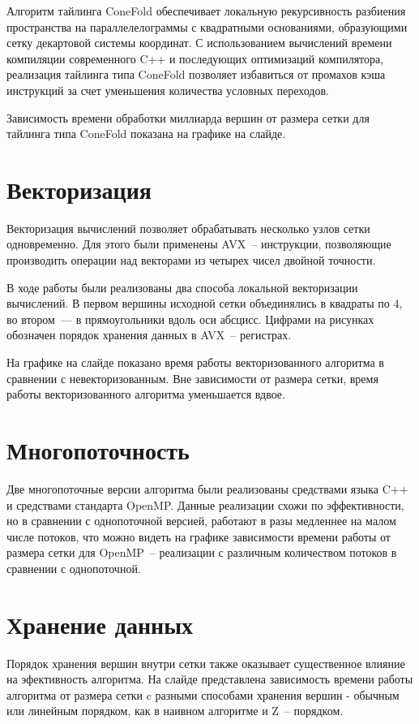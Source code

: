 \documentclass[18pt]{article}
\begin{document}
Алгоритм тайлинга ConeFold обеспечивает локальную рекурсивность разбиения
пространства на параллелелограммы с квадратными основаниями, образующими сетку
декартовой системы координат. 
С использованием вычислений времени компиляции современного C++ и 
последующих оптимизаций компилятора, реализация тайлинга типа ConeFold 
позволяет избавиться от промахов кэша инструкций за счет уменьшения количества
условных переходов.

Зависимость времени обработки миллиарда вершин от размера сетки для тайлинга
типа ConeFold показана на графике на слайде.

\section{Векторизация}
\par
Векторизация вычислений позволяет обрабатывать несколько узлов сетки 
одновременно. Для этого были применены AVX~-- инструкции, позволяющие 
производить операции над векторами из четырех чисел двойной точности.

В ходе работы были реализованы два способа локальной векторизации вычислений.
В первом вершины исходной сетки объединялись в квадраты по 4, 
во втором~--- в прямоугольники вдоль оси абсцисс.
Цифрами на рисунках обозначен порядок хранения данных в AVX~-- регистрах.

На графике на слайде показано время работы векторизованного алгоритма в 
сравнении с невекторизованным. Вне зависимости от размера сетки, время работы 
векторизованного алгоритма уменьшается вдвое.

\section{Многопоточность}
\par
Две многопоточные версии алгоритма были реализованы средствами языка C++ и 
средствами стандарта OpenMP. Данные реализации схожи по эффективности, но в 
сравнении с однопоточной версией, работают в разы медленнее на малом числе 
потоков, что можно видеть на графике зависимости времени работы от 
размера сетки для OpenMP~-- реализации с различным количеством потоков 
в сравнении с однопоточной.

\section{Хранение данных}
\par
Порядок хранения вершин внутри сетки также оказывает существенное влияние на 
эфективность алгоритма. На слайде представлена зависимость времени 
работы алгоритма от размера сетки c разными способами хранения вершин - 
обычным или линейным порядком, как в наивном алгоритме и Z~-- порядком.
\end{document}
